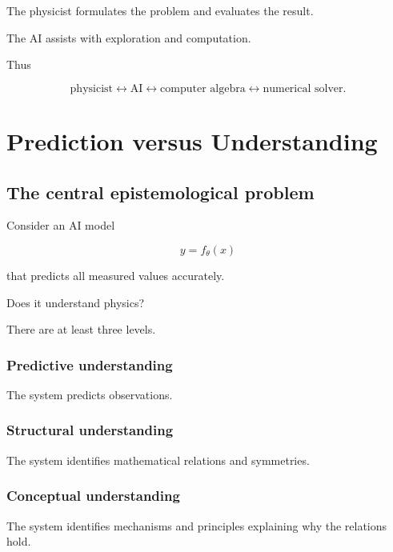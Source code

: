 \documentclass[11pt,a4paper,oneside]{book}
\begin{document}
The physicist formulates the problem and evaluates the result.

The AI assists with exploration and computation.

Thus

\begin{equation}
\text{physicist}
\leftrightarrow
\text{AI}
\leftrightarrow
\text{computer algebra}
\leftrightarrow
\text{numerical solver}.
\end{equation}

\chapter{Prediction versus Understanding}

\section{The central epistemological problem}

Consider an AI model

\begin{equation}
y=f_\theta(x)
\end{equation}

that predicts all measured values accurately.

Does it understand physics?

There are at least three levels.

\subsection{Predictive understanding}

The system predicts observations.

\subsection{Structural understanding}

The system identifies mathematical relations and symmetries.

\subsection{Conceptual understanding}

The system identifies mechanisms and principles explaining why the relations
hold.
\end{document}
